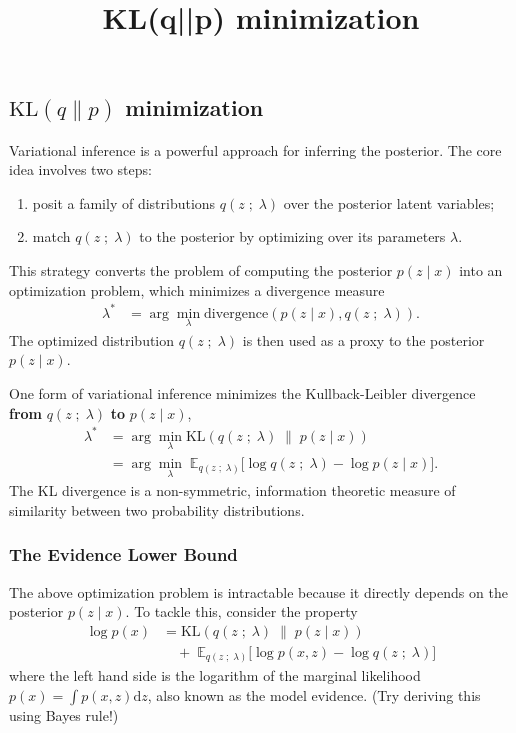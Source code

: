 \title{KL(q||p) minimization}

\subsection{$\text{KL}(q\|p)$ minimization}

Variational inference is a powerful approach for inferring the posterior. The
core idea involves two steps:
\begin{enumerate}
   \item posit a family of distributions $q(z\;;\;\lambda)$ over the
   posterior latent variables;
   \item match $q(z\;;\;\lambda)$ to the posterior by optimizing over its
   parameters $\lambda$.
 \end{enumerate}
This strategy converts the problem of computing the posterior $p(z \mid x)$ into
an optimization problem, which minimizes a divergence measure
\begin{align*}
  \lambda^*
  &=
  \arg\min_\lambda \text{divergence}(
  p(z \mid x)
  ,
  q(z\;;\;\lambda)
  ).
\end{align*}
The optimized distribution $q(z\;;\;\lambda)$ is then used as a
proxy to the posterior $p(z\mid x)$.

One form of variational inference minimizes the Kullback-Leibler divergence
\textbf{from} $q(z\;;\;\lambda)$ \textbf{to} $p(z \mid x)$,
\begin{align*}
  \lambda^*
  &=
  \arg\min_\lambda \text{KL}(
  q(z\;;\;\lambda)
  \;\|\;
  p(z \mid x)
  )\\
  &=
  \arg\min_\lambda\;
  \mathbb{E}_{q(z\;;\;\lambda)}
  \big[
  \log q(z\;;\;\lambda)
  -
  \log p(z \mid x)
  \big].
\end{align*}
The KL divergence is a non-symmetric, information theoretic measure of
similarity between two probability distributions.

\subsubsection{The Evidence Lower Bound}

The above optimization problem is intractable because it directly depends on the
posterior $p(z \mid x)$. To tackle this, consider the property
\begin{align*}
  \log p(x)
  &=
  \text{KL}(
  q(z\;;\;\lambda)
  \;\|\;
  p(z \mid x)
  )\\
  &\quad+\;
  \mathbb{E}_{q(z\;;\;\lambda)}
  \big[
  \log p(x, z)
  -
  \log q(z\;;\;\lambda)
  \big]
\end{align*}
where the left hand side is the logarithm of the marginal likelihood
$p(x) = \int p(x,z) \text{d}z$, also known as the model evidence. (Try
deriving this using Bayes rule!)

